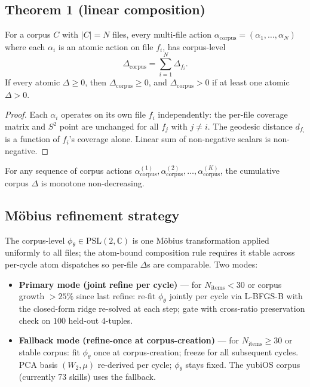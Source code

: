 \documentclass[11pt,a4paper]{article}
\begin{document}
\subsection{Theorem 1 (linear composition)}
\begin{theorem}
For a corpus $C$ with $|C| = N$ files, every multi-file action $\alpha_{\mathrm{corpus}} = (\alpha_1, \ldots, \alpha_N)$ where each $\alpha_i$ is an atomic action on file $f_i$, has corpus-level
\begin{equation}
\Delta_{\mathrm{corpus}} = \sum_{i=1}^{N} \Delta_{f_i}.
\label{eq:composition}
\end{equation}
If every atomic $\Delta \geq 0$, then $\Delta_{\mathrm{corpus}} \geq 0$, and $\Delta_{\mathrm{corpus}} > 0$ if at least one atomic $\Delta > 0$.
\end{theorem}

\begin{proof}
Each $\alpha_i$ operates on its own file $f_i$ independently: the per-file coverage matrix and $S^2$ point are unchanged for all $f_j$ with $j \neq i$. The geodesic distance $d_{f_i}$ is a function of $f_i$'s coverage alone. Linear sum of non-negative scalars is non-negative.
\end{proof}

\begin{corollary}
For any sequence of corpus actions $\alpha_{\mathrm{corpus}}^{(1)}, \alpha_{\mathrm{corpus}}^{(2)}, \ldots, \alpha_{\mathrm{corpus}}^{(K)}$, the cumulative corpus $\Delta$ is monotone non-decreasing.
\end{corollary}

\subsection{M\"obius refinement strategy}
The corpus-level $\phi_\theta \in \mathrm{PSL}(2,\mathbb{C})$ is one M\"obius transformation applied uniformly to all files; the atom-bound composition rule requires it stable across per-cycle atom dispatches so per-file $\Delta$s are comparable. Two modes:

\begin{itemize}
\item \textbf{Primary mode (joint refine per cycle)} --- for $N_{\mathrm{items}} < 30$ or corpus growth $> 25\%$ since last refine: re-fit $\phi_\theta$ jointly per cycle via L-BFGS-B with the closed-form ridge re-solved at each step; gate with cross-ratio preservation check on $100$ held-out $4$-tuples.
\item \textbf{Fallback mode (refine-once at corpus-creation)} --- for $N_{\mathrm{items}} \geq 30$ or stable corpus: fit $\phi_\theta$ once at corpus-creation; freeze for all subsequent cycles. PCA basis $(W_2, \mu)$ re-derived per cycle; $\phi_\theta$ stays fixed. The yubiOS corpus (currently 73 skills) uses the fallback.
\end{itemize}
\end{document}
